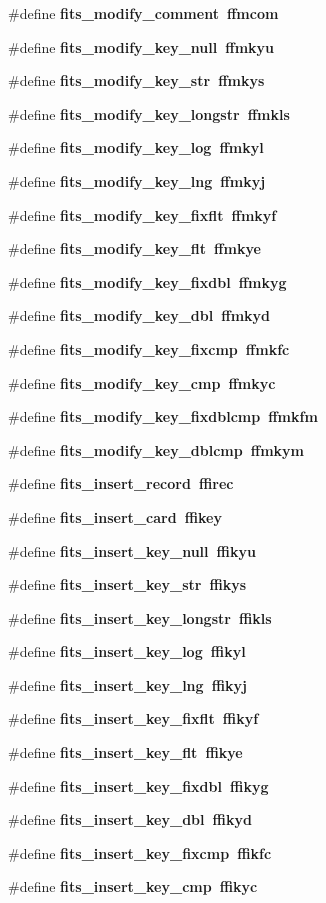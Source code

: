 \begin{CompactItemize}
\#define \bf{fits\_\-modify\_\-comment}~ffmcom
\item 
\#define \bf{fits\_\-modify\_\-key\_\-null}~ffmkyu
\item 
\#define \bf{fits\_\-modify\_\-key\_\-str}~ffmkys
\item 
\#define \bf{fits\_\-modify\_\-key\_\-longstr}~ffmkls
\item 
\#define \bf{fits\_\-modify\_\-key\_\-log}~ffmkyl
\item 
\#define \bf{fits\_\-modify\_\-key\_\-lng}~ffmkyj
\item 
\#define \bf{fits\_\-modify\_\-key\_\-fixflt}~ffmkyf
\item 
\#define \bf{fits\_\-modify\_\-key\_\-flt}~ffmkye
\item 
\#define \bf{fits\_\-modify\_\-key\_\-fixdbl}~ffmkyg
\item 
\#define \bf{fits\_\-modify\_\-key\_\-dbl}~ffmkyd
\item 
\#define \bf{fits\_\-modify\_\-key\_\-fixcmp}~ffmkfc
\item 
\#define \bf{fits\_\-modify\_\-key\_\-cmp}~ffmkyc
\item 
\#define \bf{fits\_\-modify\_\-key\_\-fixdblcmp}~ffmkfm
\item 
\#define \bf{fits\_\-modify\_\-key\_\-dblcmp}~ffmkym
\item 
\#define \bf{fits\_\-insert\_\-record}~ffirec
\item 
\#define \bf{fits\_\-insert\_\-card}~ffikey
\item 
\#define \bf{fits\_\-insert\_\-key\_\-null}~ffikyu
\item 
\#define \bf{fits\_\-insert\_\-key\_\-str}~ffikys
\item 
\#define \bf{fits\_\-insert\_\-key\_\-longstr}~ffikls
\item 
\#define \bf{fits\_\-insert\_\-key\_\-log}~ffikyl
\item 
\#define \bf{fits\_\-insert\_\-key\_\-lng}~ffikyj
\item 
\#define \bf{fits\_\-insert\_\-key\_\-fixflt}~ffikyf
\item 
\#define \bf{fits\_\-insert\_\-key\_\-flt}~ffikye
\item 
\#define \bf{fits\_\-insert\_\-key\_\-fixdbl}~ffikyg
\item 
\#define \bf{fits\_\-insert\_\-key\_\-dbl}~ffikyd
\item 
\#define \bf{fits\_\-insert\_\-key\_\-fixcmp}~ffikfc
\item 
\#define \bf{fits\_\-insert\_\-key\_\-cmp}~ffikyc
\item 

\end{CompactItemize}
